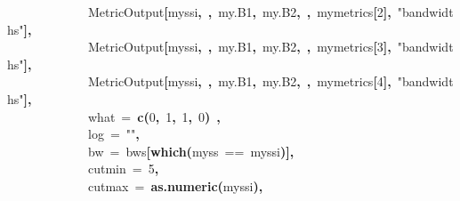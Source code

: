 \documentclass{article}
\makeatletter
\newcommand{\hlnumber}[1]{\textcolor[rgb]{0,0,0}{#1}}%
\newcommand{\hlfunctioncall}[1]{\textcolor[rgb]{0.501960784313725,0,0.329411764705882}{\textbf{#1}}}%
\newcommand{\hlstring}[1]{\textcolor[rgb]{0.6,0.6,1}{#1}}%
\newcommand{\hlkeyword}[1]{\textcolor[rgb]{0,0,0}{\textbf{#1}}}%
\newcommand{\hlargument}[1]{\textcolor[rgb]{0.690196078431373,0.250980392156863,0.0196078431372549}{#1}}%
\newcommand{\hlsymbol}[1]{\textcolor[rgb]{0,0,0}{#1}}%
\newcommand{\hlstd}[1]{\textcolor[rgb]{0,0,0}{#1}}%
\newenvironment{kframe}{%
 \def\FrameCommand##1{\hskip\@totalleftmargin \hskip-\fboxsep
 \colorbox{shadecolor}{##1}\hskip-\fboxsep
     \hskip-\linewidth \hskip-\@totalleftmargin \hskip\columnwidth}%
 \MakeFramed {\advance\hsize-\width
   \@totalleftmargin\z@ \linewidth\hsize
   \@setminipage}}%
 {\par\unskip\endMakeFramed}
\newenvironment{knitrout}{}{} %
\makeatother
\begin{document}
\begin{knitrout}
\begin{kframe}
\begin{flushleft}
\hlstd{}{\ }{\ }{\ }{\ }{\ }{\ }{\ }{\ }{\ }{\ }{\ }{\ }{\ }\hlsymbol{MetricOutput}\hlkeyword{[}\hlsymbol{myssi}\hlkeyword{,}{\ }\hlkeyword{,}{\ }\hlsymbol{my.B1}\hlkeyword{,}{\ }\hlsymbol{my.B2}\hlkeyword{,}{\ }\hlkeyword{,}{\ }\hlsymbol{mymetrics}\hlkeyword{[}\hlnumber{2}\hlkeyword{]}\hlkeyword{,}{\ }\hlstring{"{}bandwidths"{}}\hlkeyword{]}\hlkeyword{,}\hspace*{\fill}\\
\hlstd{}{\ }{\ }{\ }{\ }{\ }{\ }{\ }{\ }{\ }{\ }{\ }{\ }{\ }\hlsymbol{MetricOutput}\hlkeyword{[}\hlsymbol{myssi}\hlkeyword{,}{\ }\hlkeyword{,}{\ }\hlsymbol{my.B1}\hlkeyword{,}{\ }\hlsymbol{my.B2}\hlkeyword{,}{\ }\hlkeyword{,}{\ }\hlsymbol{mymetrics}\hlkeyword{[}\hlnumber{3}\hlkeyword{]}\hlkeyword{,}{\ }\hlstring{"{}bandwidths"{}}\hlkeyword{]}\hlkeyword{,}\hspace*{\fill}\\
\hlstd{}{\ }{\ }{\ }{\ }{\ }{\ }{\ }{\ }{\ }{\ }{\ }{\ }{\ }\hlsymbol{MetricOutput}\hlkeyword{[}\hlsymbol{myssi}\hlkeyword{,}{\ }\hlkeyword{,}{\ }\hlsymbol{my.B1}\hlkeyword{,}{\ }\hlsymbol{my.B2}\hlkeyword{,}{\ }\hlkeyword{,}{\ }\hlsymbol{mymetrics}\hlkeyword{[}\hlnumber{4}\hlkeyword{]}\hlkeyword{,}{\ }\hlstring{"{}bandwidths"{}}\hlkeyword{]}\hlkeyword{,}\hspace*{\fill}\\
\hlstd{}{\ }{\ }{\ }{\ }{\ }{\ }{\ }{\ }{\ }{\ }{\ }{\ }{\ }\hlargument{what}{\ }\hlargument{=}{\ }\hlfunctioncall{c}\hlkeyword{(}\hlnumber{0}\hlkeyword{,}{\ }\hlnumber{1}\hlkeyword{,}{\ }\hlnumber{1}\hlkeyword{,}{\ }\hlnumber{0}\hlkeyword{)}{\ }\hlkeyword{,}\hspace*{\fill}\\
\hlstd{}{\ }{\ }{\ }{\ }{\ }{\ }{\ }{\ }{\ }{\ }{\ }{\ }{\ }\hlargument{log}{\ }\hlargument{=}{\ }\hlstring{"{}"{}}\hlkeyword{,}\hspace*{\fill}\\
\hlstd{}{\ }{\ }{\ }{\ }{\ }{\ }{\ }{\ }{\ }{\ }{\ }{\ }{\ }\hlargument{bw}{\ }\hlargument{=}{\ }\hlsymbol{bws}\hlkeyword{[}\hlfunctioncall{which}\hlkeyword{(}\hlsymbol{myss}{\ }=={\ }\hlsymbol{myssi}\hlkeyword{)}\hlkeyword{]}\hlkeyword{,}\hspace*{\fill}\\
\hlstd{}{\ }{\ }{\ }{\ }{\ }{\ }{\ }{\ }{\ }{\ }{\ }{\ }{\ }\hlargument{cutmin}{\ }\hlargument{=}{\ }\hlnumber{5}\hlkeyword{,}\hspace*{\fill}\\
\hlstd{}{\ }{\ }{\ }{\ }{\ }{\ }{\ }{\ }{\ }{\ }{\ }{\ }{\ }\hlargument{cutmax}{\ }\hlargument{=}{\ }\hlfunctioncall{as.numeric}\hlkeyword{(}\hlsymbol{myssi}\hlkeyword{)}\hlkeyword{,}\hspace*{\fill}\\

\end{flushleft}
\end{kframe}
\end{knitrout}
\end{document}
